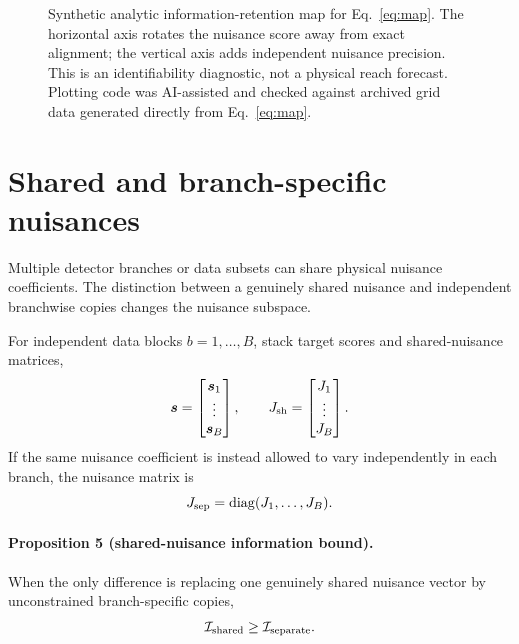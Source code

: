 \begin{figure}[t]
\centering

\caption{Synthetic analytic information-retention map for Eq.~\eqref{eq:map}. The horizontal axis rotates the nuisance score away from exact alignment; the vertical axis adds independent nuisance precision. This is an identifiability diagnostic, not a physical reach forecast. Plotting code was AI-assisted and checked against archived grid data generated directly from Eq.~\eqref{eq:map}.}
\label{fig:map}
\end{figure}

\section{Shared and branch-specific nuisances}
\label{sec:branches}

Multiple detector branches or data subsets can share physical nuisance coefficients. The distinction between a genuinely shared nuisance and independent branchwise copies changes the nuisance subspace.

For independent data blocks $b=1,\ldots,B$, stack target scores and shared-nuisance matrices,
\begin{equation}
 \bm s=\begin{bmatrix}\bm s_1\\ \vdots\\ \bm s_B\end{bmatrix},
 \qquad
 J_{\rm sh}=\begin{bmatrix}J_1\\ \vdots\\ J_B\end{bmatrix}.
\end{equation}
If the same nuisance coefficient is instead allowed to vary independently in each branch, the nuisance matrix is
\begin{equation}
 J_{\rm sep}=\operatorname{diag}(J_1,\ldots,J_B).
\end{equation}

\paragraph*{Proposition 5 (shared-nuisance information bound).}
When the only difference is replacing one genuinely shared nuisance vector by unconstrained branch-specific copies,
\begin{equation}
 \mathcal I_{\rm shared}\ge \mathcal I_{\rm separate}.
\label{eq:sharedbound}
\end{equation}

